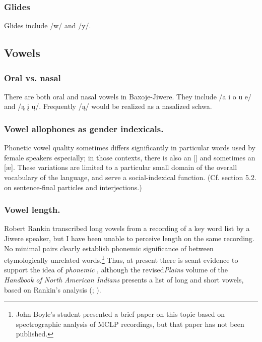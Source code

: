\documentclass[output=paper]{LSP/langsci}
\begin{document}
\subsubsection{Glides}
Glides include /w/ and /y/.  

\subsection{Vowels} 										      	         	          
\subsubsection{Oral vs. nasal}  
There are both oral and nasal vowels in Baxoje-Jiwere.   They include /a i o u e/ and /\k{a} \k{i} \k{u}/. Frequently /\k{a}/ would be realized as a nasalized schwa. 

\subsubsection{Vowel allophones as {gender} indexicals.}  Phonetic vowel quality sometimes differs significantly in particular words used by female speakers especially; in those contexts, there is also an [] and sometimes an [\ae].  These variations are limited to a particular small domain of the overall vocabulary of the language, and serve a social-indexical function. (Cf. section 5.2. on sentence-final particles and interjections.)   

\subsubsection{Vowel length.} 
Robert Rankin transcribed long vowels from a recording of a key word list by a Jiwere speaker, but I have been unable to perceive length on the same recording. No minimal pairs clearly establish phonemic significance of  between etymologically unrelated words.\footnote{John Boyle's student presented a brief paper on this topic based on spectrographic analysis of MCLP recordings, but that paper has not been published.}  Thus, at present there is scant evidence to support the idea of \textit{phonemic} , although the revised\emph{Plains} volume of the \textit{Handbook of North American Indians} presents a list of long and short vowels, based on Rankin's analysis (\citealt[432]{Wedel2001}; \citealt[447]{Schweitzer2001}).  	         
\end{document}
